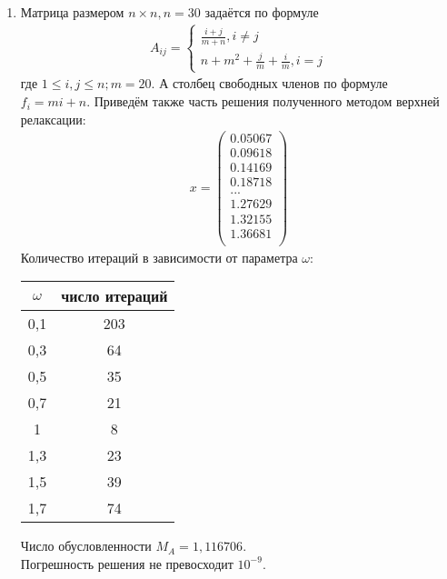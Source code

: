 \documentclass[a4paper,12pt,titlepage,finall]{article}
\begin{document}
\begin{enumerate}
\item
Матрица размером $n \times n, n = 30$ задаётся по формуле
\begin{align}
A_{ij} = \left\{
\begin{array}{ll}
\frac{i+j}{m+n}, i \neq j\\
n + m^2 + \frac{j}{m} + \frac{i}{m}, i = j
\end{array}
\right.
\end{align}
где $1 \leq i,j \leq n; m = 20$. А столбец свободных членов по формуле $f_i = mi + n$. Приведём также часть решения полученного методом верхней релаксации:
\begin{align*}
x = \begin{pmatrix}
0.05067 \\
   0.09618 \\
   0.14169 \\
   0.18718 \\
   ...\\
   1.27629 \\
   1.32155 \\
   1.36681 \\
\end{pmatrix}
\end{align*}
Количество итераций в зависимости от параметра $\omega$:
\begin{center}
\begin{tabular}{|c|c|}
\hline
$\omega$ & число итераций\\
\hline
0,1 & 203\\
0,3 & 64\\
0,5 & 35\\
0,7 & 21\\
 1 & 8\\
 1,3 & 23\\
 1,5 & 39\\
 1,7 & 74\\
 \hline
\end{tabular}
\end{center}

Число обусловленности $M_A = 1,116706$.\\
Погрешность решения не превосходит $10^{-9}$.


\end{enumerate}
\end{document}
